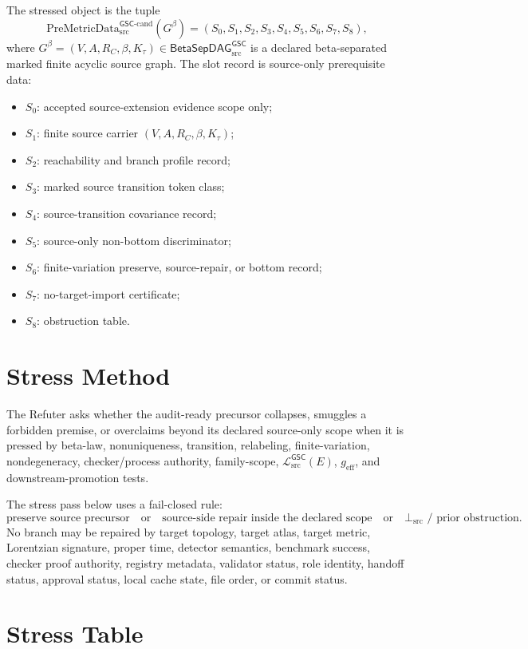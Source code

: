 \documentclass[11pt]{article}
\newcommand{\PreMetricData}{\mathrm{PreMetricData}_{\mathrm{src}}^{\mathsf{GSC}\mbox{-}\mathrm{cand}}}
\newcommand{\MetricData}{\mathcal{L}_{\mathrm{src}}^{\mathsf{GSC}}}
\newcommand{\BottomSrc}{\bot_{\mathrm{src}}}
\newcommand{\BetaGraph}{\mathsf{BetaSepDAG}_{\mathrm{src}}^{\mathsf{GSC}}}
\newcommand{\Gbeta}{G^\beta}
\newcommand{\geff}{g_{\mathrm{eff}}}
\newcommand{\Ktau}{K_\tau}
\begin{document}
The stressed object is the tuple
\[
  \PreMetricData(\Gbeta)=(S_0,S_1,S_2,S_3,S_4,S_5,S_6,S_7,S_8),
\]
where \(\Gbeta=(V,A,R_C,\beta,\Ktau)\in\BetaGraph\) is a declared
beta-separated marked finite acyclic source graph. The slot record is
source-only prerequisite data:
\begin{itemize}[leftmargin=*]
  \item \(S_0\): accepted source-extension evidence scope only;
  \item \(S_1\): finite source carrier \((V,A,R_C,\beta,\Ktau)\);
  \item \(S_2\): reachability and branch profile record;
  \item \(S_3\): marked source transition token class;
  \item \(S_4\): source-transition covariance record;
  \item \(S_5\): source-only non-bottom discriminator;
  \item \(S_6\): finite-variation preserve, source-repair, or bottom record;
  \item \(S_7\): no-target-import certificate;
  \item \(S_8\): obstruction table.
\end{itemize}

\section{Stress Method}

The Refuter asks whether the audit-ready precursor collapses, smuggles a
forbidden premise, or overclaims beyond its declared source-only scope when it
is pressed by beta-law, nonuniqueness, transition, relabeling,
finite-variation, nondegeneracy, checker/process authority, family-scope,
\(\MetricData(E)\), \(\geff\), and downstream-promotion tests.

The stress pass below uses a fail-closed rule:
\[
  \text{preserve source precursor}\quad\text{or}\quad
  \text{source-side repair inside the declared scope}\quad\text{or}\quad
  \BottomSrc\text{ / prior obstruction}.
\]
No branch may be repaired by target topology, target atlas, target metric,
Lorentzian signature, proper time, detector semantics, benchmark success,
checker proof authority, registry metadata, validator status, role identity,
handoff status, approval status, local cache state, file order, or commit
status.

\section{Stress Table}
\end{document}
